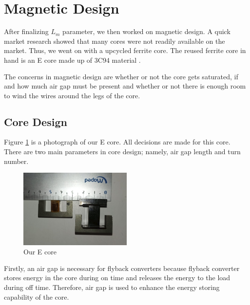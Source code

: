 \documentclass[12pt]{article}
\begin{document}
\section{Magnetic Design}

    After finalizing $L_m$ parameter, we then worked on magnetic design. A quick market research showed that many cores were not readily available on the market. Thus, we went on with a upcycled ferrite core. The reused ferrite core in hand is an E core made up of 3C94 material \cite{core}.
    
    The concerns in magnetic design are whether or not the core gets saturated, if and how much air gap must be present and whether or not there is enough room to wind the wires around the legs of the core.
    \subsection{Core Design}

    Figure \ref{fig:photo of core} is a photograph of our E core. All decisions are made for this core. There are two main parameters in core design; namely, air gap length and turn number.

    \begin{figure}[H]
        \centering
        \includegraphics[width=0.5\textwidth]{img/core.png}
        \caption{Our E core}
        \label{fig:photo of core}
    \end{figure}

    Firstly, an air gap is necessary for flyback converters because flyback converter stores energy in the core during on time and releases the energy to the load during off time. Therefore, air gap is used to enhance the energy storing capability of the core.
\end{document}
